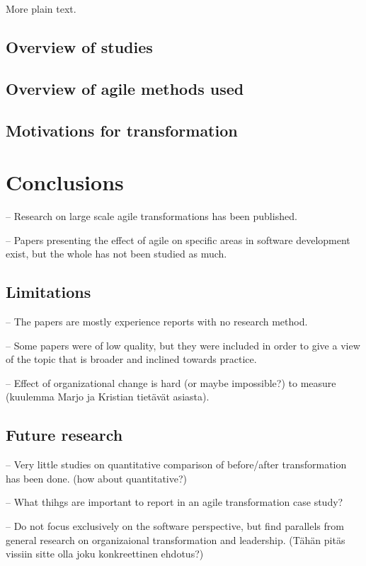 \documentclass[lnbip]{svmultln}
\begin{document}
More plain text.

\subsection{Overview of studies}

\lipsum[1]

\subsection{Overview of agile methods used}

\lipsum[1]

\subsection{Motivations for transformation}

\lipsum[1]


\section{Conclusions}
\label{sec:conclusions}

-- Research on large scale agile transformations has been published.

-- Papers presenting the effect of agile on specific areas in software
development exist, but the whole has not been studied as much.

\subsection{Limitations}

-- The papers are mostly experience reports with no research method.

-- Some papers were of low quality, but they were included in order to give a
view of the topic that is broader and inclined towards practice.

-- Effect of organizational change is hard (or maybe impossible?) to measure
(kuulemma Marjo ja Kristian tietävät asiasta).

\subsection{Future research}

-- Very little studies on quantitative comparison of before/after transformation
has been done. (how about quantitative?)

-- What thihgs are important to report in an agile transformation case study?

-- Do not focus exclusively on the software perspective, but find parallels from
general research on organizaional transformation and leadership. (Tähän pitäs
vissiin sitte olla joku konkreettinen ehdotus?)

\lipsum[1]






\end{document}
